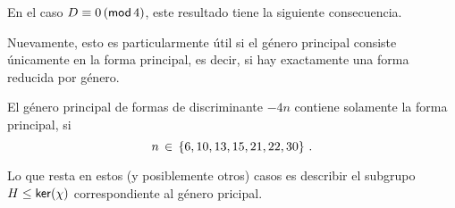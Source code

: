 \lemaGenerosBCoclases*

En el caso $D\equiv 0\tmodulo[4]$, este resultado tiene la siguiente
consecuencia.

\coroGenerosBDescenso*

Nuevamente, esto es particularmente \'util si el g\'enero principal
consiste \'unicamente en la forma principal, es decir, si hay
exactamente una forma reducida por g\'enero.

\begin{ejemResumen}\label{ejem:resumen}
	El g\'enero principal de formas de discriminante $-4n$
	contiene solamente la forma principal, si
	\begin{displaymath}
		n\,\in\,\{6,10,13,15,21,22,30\}
		\dispstop
	\end{displaymath}
\end{ejemResumen}

Lo que resta en estos (y posiblemente otros) casos es describir el
subgrupo $H\subgrpeq\ker(\chi)$ correspondiente al g\'enero pricipal.


